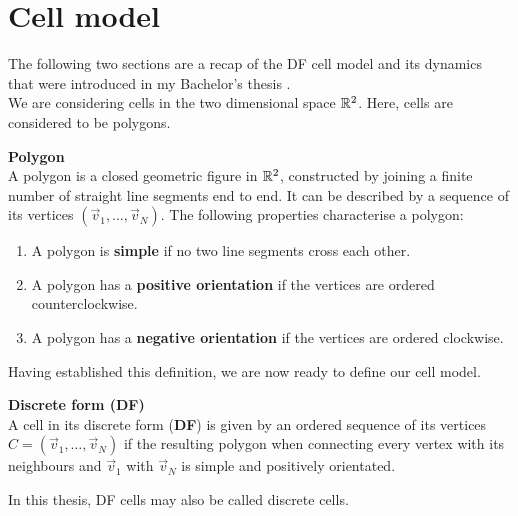 \section{Cell model} 

The following two sections are a recap of the DF cell model and its dynamics that were introduced in my Bachelor's thesis \cite{Vogel2023}. \\
We are considering cells in the two dimensional space $\mathbb{R}^2$. Here, cells are considered to be polygons. 

\begin{definition} \textbf{Polygon} \\
	A polygon is a closed geometric figure in $\mathbb{R}^2$, constructed by joining a finite number of straight line segments end to end. 
	It can be described by a sequence of its vertices $(\vec{v}_1, \ldots, \vec{v}_N)$.
	The following properties characterise a polygon:
	\begin{enumerate}
		\item A polygon is \textbf{simple} if no two line segments cross each other. 
		\item A polygon has a \textbf{positive orientation} if the vertices are ordered counterclockwise.
		\item A polygon has a \textbf{negative orientation} if the vertices are ordered clockwise.
	\end{enumerate}
\end{definition}

Having established this definition, we are now ready to define our cell model.

\begin{definition} \textbf{Discrete form (DF)} \label{def:DF}  \\
	A cell in its discrete form (\textbf{DF}) is given by an ordered sequence of its vertices $C = (\vec{v}_1, \ldots , \vec{v}_N)$ if the resulting polygon when connecting every vertex with its neighbours and $\vec{v}_1$ with $\vec{v}_N$  is simple and positively orientated. 
\end{definition}

In this thesis, DF cells may also be called discrete cells. \\ 

